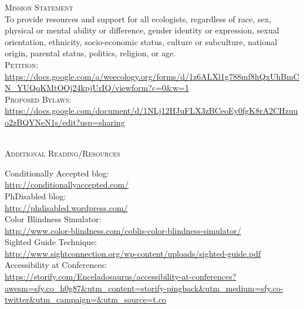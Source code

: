 \documentclass{beamer}
\begin{document}
\begin{center}
\begin{minipage}{0.25\linewidth}
\textsc{Mission Statement}\\
To provide resources and support for all ecologists, regardless of race, sex, physical or mental ability or difference, gender identity or expression, sexual orientation, ethnicity, socio-economic status, culture or subculture, national origin,  parental status, politics, religion, or age.\\

\textsc{Petition:}\\
\url{https://docs.google.com/a/weecology.org/forms/d/1z6ALXl1g788mf8hQxUhBmCN_YUQqKMtOOj24kpjUrIQ/viewform?c=0&w=1}\\

\textsc{Proposed Bylaws:}\\
\url{https://docs.google.com/document/d/1NLj12HJuFLX3zBCeoEy0fgK8rA2CHzuuo2zBQYNeN1s/edit?usp=sharing}\\
~\\

\begin{Large}
\textsc{Additional Reading/Resources}\\
\end{Large}
Conditionally Accepted blog:\\
\url{http://conditionallyaccepted.com/}\\
PhDisabled blog:\\
\url{http://phdisabled.wordpress.com/}\\
Color Blindness Simulator:\\
\url{http://www.color-blindness.com/coblis-color-blindness-simulator/}\\
Sighted Guide Technique:\\
\url{http://www.sightconnection.org/wp-content/uploads/sighted-guide.pdf}\\
Accessibility at Conferences:\\
\url{https://storify.com/Enceladosaurus/accessibility-at-conferences?awesm=sfy.co_h0g87&utm_content=storify-pingback&utm_medium=sfy.co-twitter&utm_campaign=&utm_source=t.co}\\
\end{minipage}
\end{center}
\end{document}
